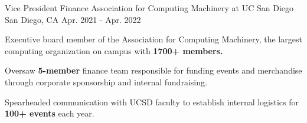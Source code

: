 
\begin{cventries}

\cventry
{Vice President Finance} %
{Association for Computing Machinery at UC San Diego} %
{San Diego, CA} %
{Apr. 2021 - Apr. 2022} %
{
  \begin{cvitems} %
    \item {Executive board member of the Association for Computing Machinery, the largest computing organization on campus with \textbf{1700+ members.}}
    \item {Oversaw \textbf{5-member} finance team responsible for funding events and merchandise through corporate sponsorship and internal fundraising. }
    \item {Spearheaded communication with UCSD faculty to establish internal logistics for \textbf{100+ events} each year. }
  \end{cvitems}
}

\end{cventries}
